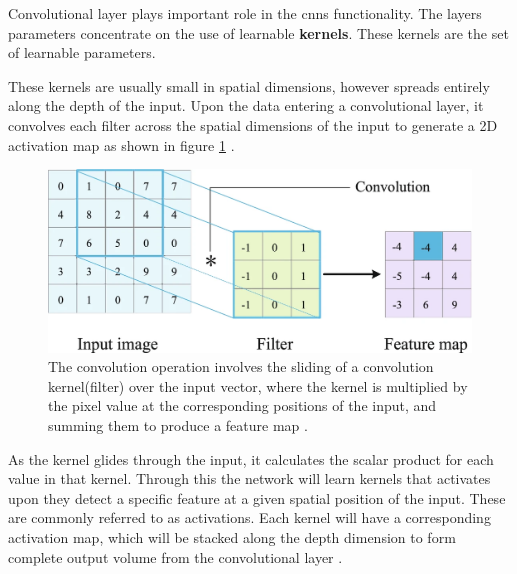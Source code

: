 Convolutional layer plays important role in the \glspl{cnn} functionality. The layers parameters concentrate on the use of learnable \textbf{kernels}. These kernels are the set of learnable parameters.

These kernels are usually small in spatial dimensions, however spreads entirely along the depth of the input. Upon the data entering a convolutional layer, it convolves each filter across the spatial dimensions of the input to generate a 2D activation map as shown in figure \ref{fig:convolutional layer} \cite{oshea2015introductionconvolutionalneuralnetworks}.


\begin{figure}[ht!]
    \centering
    \includegraphics[width=1\linewidth]{Rohit_Master_Thesis//Images/conv_layer_v2.png}
    \caption{The convolution operation involves the sliding of a convolution kernel(filter) over the input vector, where the kernel is multiplied by the pixel value at the corresponding positions of the input, and summing them to produce a feature map \cite{Zhao2024}.}
    \label{fig:convolutional layer}
\end{figure}

As the kernel glides through the input, it calculates the scalar product for each value in that kernel. Through this the network will learn kernels that activates upon they detect a specific feature at a given spatial position of the input. These are commonly referred to as activations. Each kernel will have a corresponding activation map, which will be stacked along the depth dimension to form complete output volume from the convolutional layer \cite{oshea2015introductionconvolutionalneuralnetworks}.

